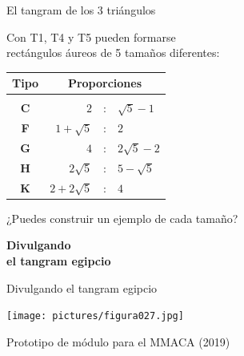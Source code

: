 \documentclass[14pt,aspectratio=169,usenames,dvipsnames]{beamer}
\begin{document}
    \begin{frame}{El tangram de los 3 triángulos}
        \begin{center}
            Con T1, T4 y T5 pueden formarse\\[0.5ex]rectángulos áureos de 5 tamaños diferentes:

            \bigskip\bigskip

            {\small\begin{tabular}{c|rcl}
                \textbf{Tipo} & \multicolumn{3}{c}{\textbf{Proporciones}} \\[0.5ex]\hline&&&\\[-1.5ex]
                \textbf{C} & $2$               &\!\!\!\!:\!\!\!\!& $\sqrt{5}\!-\!1$  \\
                \textbf{F} & $1\!+\!\sqrt{5}$  &\!\!\!\!:\!\!\!\!& $2$               \\
                \textbf{G} & $4$               &\!\!\!\!:\!\!\!\!& $2\sqrt{5}\!-\!2$ \\
                \textbf{H} & $2\sqrt{5}$       &\!\!\!\!:\!\!\!\!& $5\!-\!\sqrt{5}$  \\
                \textbf{K} & $2\!+\!2\sqrt{5}$ &\!\!\!\!:\!\!\!\!& $4$               \\
            \end{tabular}}

            \bigskip\bigskip

            ¿Puedes construir un ejemplo de cada tamaño?
        \end{center}
    \end{frame}


    \begin{frame}{}
        \begin{center}
            \textbf{\Huge Divulgando\\el tangram egipcio}\\
        \end{center}
    \end{frame}


    \begin{frame}{Divulgando el tangram egipcio}
        \begin{center}
            \texttt{[image: pictures/figura027.jpg]} \\

            \bigskip

            Prototipo de módulo para el MMACA (2019)
        \end{center}
    \end{frame}
\end{document}
